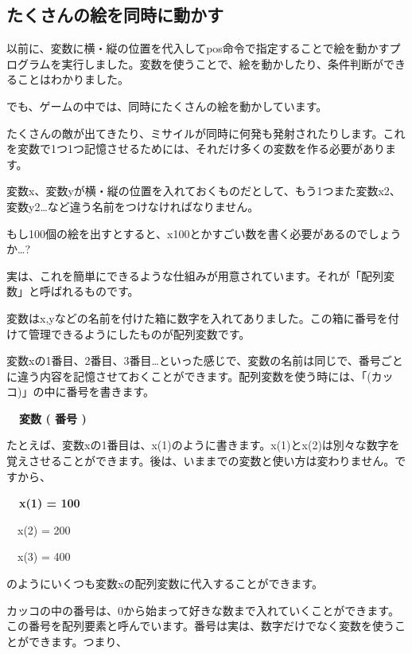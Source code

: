 \documentclass[a4paper,12pt]{jarticle}
\begin{document}
\bigskip
\bigskip
\bigskip

\clearpage
\subsection{たくさんの絵を同時に動かす}
\bigskip
\bigskip

以前に、変数に横・縦の位置を代入してpos命令で指定することで絵を動かすプログラムを実行しました。変数を使うことで、絵を動かしたり、条件判断ができることはわかりました。

でも、ゲームの中では、同時にたくさんの絵を動かしています。

たくさんの敵が出てきたり、ミサイルが同時に何発も発射されたりします。これを変数で1つ1つ記憶させるためには、それだけ多くの変数を作る必要があります。

変数x、変数yが横・縦の位置を入れておくものだとして、もう1つまた変数x2、変数y2…など違う名前をつけなければなりません。

もし100個の絵を出すとすると、x100とかすごい数を書く必要があるのでしょうか…?


\bigskip

実は、これを簡単にできるような仕組みが用意されています。それが「配列変数」と呼ばれるものです。

変数はx,yなどの名前を付けた箱に数字を入れてありました。この箱に番号を付けて管理できるようにしたものが配列変数です。

変数xの1番目、2番目、3番目…といった感じで、変数の名前は同じで、番号ごとに違う内容を記憶させておくことができます。配列変数を使う時には、「(カッコ)」の中に番号を書きます。


\bigskip

{\bfseries
\ \ 変数 ( 番号 )}


\bigskip

たとえば、変数xの1番目は、x(1)のように書きます。x(1)とx(2)は別々な数字を覚えさせることができます。後は、いままでの変数と使い方は変わりません。ですから、


\bigskip

{\bfseries
\ \ x(1) = 100

\ \ x(2) = 200

\ \ x(3) = 400}


\bigskip

のようにいくつも変数xの配列変数に代入することができます。

カッコの中の番号は、0から始まって好きな数まで入れていくことができます。この番号を配列要素と呼んでいます。番号は実は、数字だけでなく変数を使うことができます。つまり、
\end{document}
